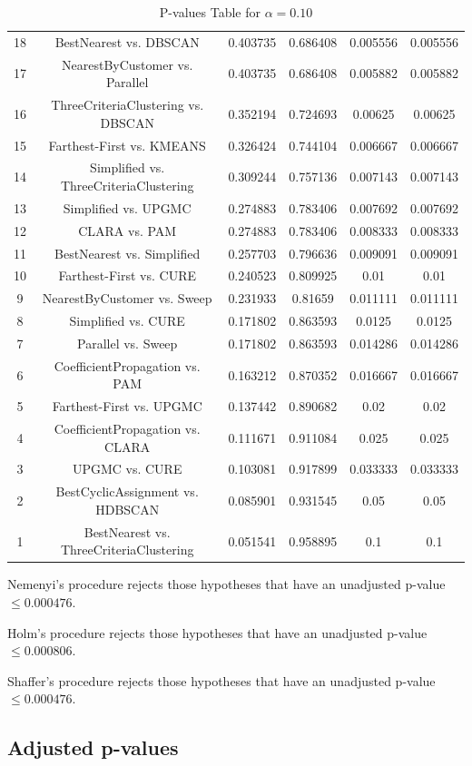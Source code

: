 \documentclass[a4paper,10pt]{article}
\begin{document}
\begin{landscape}
\begin{table}[!htp]
\begin{tabular}{cccccc}
18&BestNearest vs. DBSCAN&0.403735&0.686408&0.005556&0.005556\\
17&NearestByCustomer vs. Parallel&0.403735&0.686408&0.005882&0.005882\\
16&ThreeCriteriaClustering vs. DBSCAN&0.352194&0.724693&0.00625&0.00625\\
15&Farthest-First vs. KMEANS&0.326424&0.744104&0.006667&0.006667\\
14&Simplified vs. ThreeCriteriaClustering&0.309244&0.757136&0.007143&0.007143\\
13&Simplified vs. UPGMC&0.274883&0.783406&0.007692&0.007692\\
12&CLARA vs. PAM&0.274883&0.783406&0.008333&0.008333\\
11&BestNearest vs. Simplified&0.257703&0.796636&0.009091&0.009091\\
10&Farthest-First vs. CURE&0.240523&0.809925&0.01&0.01\\
9&NearestByCustomer vs. Sweep&0.231933&0.81659&0.011111&0.011111\\
8&Simplified vs. CURE&0.171802&0.863593&0.0125&0.0125\\
7&Parallel vs. Sweep&0.171802&0.863593&0.014286&0.014286\\
6&CoefficientPropagation vs. PAM&0.163212&0.870352&0.016667&0.016667\\
5&Farthest-First vs. UPGMC&0.137442&0.890682&0.02&0.02\\
4&CoefficientPropagation vs. CLARA&0.111671&0.911084&0.025&0.025\\
3&UPGMC vs. CURE&0.103081&0.917899&0.033333&0.033333\\
2&BestCyclicAssignment vs. HDBSCAN&0.085901&0.931545&0.05&0.05\\
1&BestNearest vs. ThreeCriteriaClustering&0.051541&0.958895&0.1&0.1\\
\hline
\end{tabular}
\caption{P-values Table for $\alpha=0.10$}
\end{table}Nemenyi's procedure rejects those hypotheses that have an unadjusted p-value $\le0.000476$.

Holm's procedure rejects those hypotheses that have an unadjusted p-value $\le0.000806$.

Shaffer's procedure rejects those hypotheses that have an unadjusted p-value $\le0.000476$.

\pagebreak

\subsection{Adjusted p-values}


\end{landscape}
\end{document}
